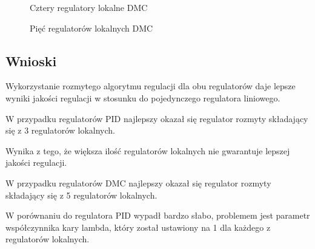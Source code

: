\begin{figure}[H] 
   \centering
   
   \caption{Cztery regulatory lokalne DMC}
   \label{projekt:zad6:DMC:4:figure}
\end{figure}

\begin{figure}[H] 
   \centering
   
   \caption{Pięć regulatorów lokalnych DMC}
   \label{projekt:zad6:DMC:5:figure}
\end{figure}

\subsection{Wnioski}

Wykorzystanie	rozmytego	algorytmu	regulacji	dla	obu	regulatorów	daje	
lepsze	wyniki	jakości	regulacji	w	stosunku	do	pojedynczego regulatora	liniowego.	


W	przypadku	regulatorów	PID najlepszy	okazał	się	regulator	rozmyty składający	
się z	3	regulatorów	lokalnych. 

Wynika	z	tego,	że	większa	ilość	regulatorów	
lokalnych	nie	gwarantuje	lepszej	jakości	regulacji.


W	przypadku	regulatorów	DMC najlepszy	okazał	się	regulator	rozmyty
składający	się z	 5	regulatorów	lokalnych. 

W	porównaniu	do	regulatora	PID	
wypadł	bardzo	słabo,	problemem	jest	parametr	współczynnika	kary	lambda,	
który	został	ustawiony	na	1	dla	każdego	z	regulatorów	lokalnych.
\newpage
